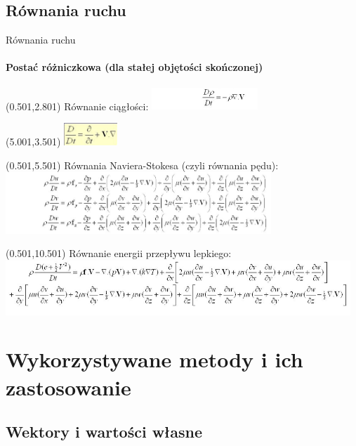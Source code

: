 \documentclass[aspectratio=169]{beamer}
\begin{document}
	\subsection{Równania ruchu}
	\begin{frame}{Równania ruchu}
		\framesubtitle{Postać różniczkowa (dla stałej objętości skończonej)}
		\begin{textblock}{4}(0.501,2.801)
			Równanie ciągłości:
			\includegraphics[width=4cm]{imgs/ciaglosc.png}
		\end{textblock}
		\begin{textblock}{4}(5.001,3.501)
			\includegraphics[width=2cm]{imgs/ciaglosc2.png}
		\end{textblock}
		\begin{textblock}{10}(0.501,5.501)
			Równania Naviera-Stokesa (czyli równania pędu):
			\includegraphics[width=10cm]{imgs/NS.png}
		\end{textblock}
		\begin{textblock}{13}(0.501,10.501)
			Równanie energii przepływu lepkiego:
			\includegraphics[width=13cm]{imgs/energia.png}
		\end{textblock}
	\end{frame}
	
	
	\section{Wykorzystywane metody i ich zastosowanie}
	\subsection{Wektory i wartości własne}
	
\end{document}
